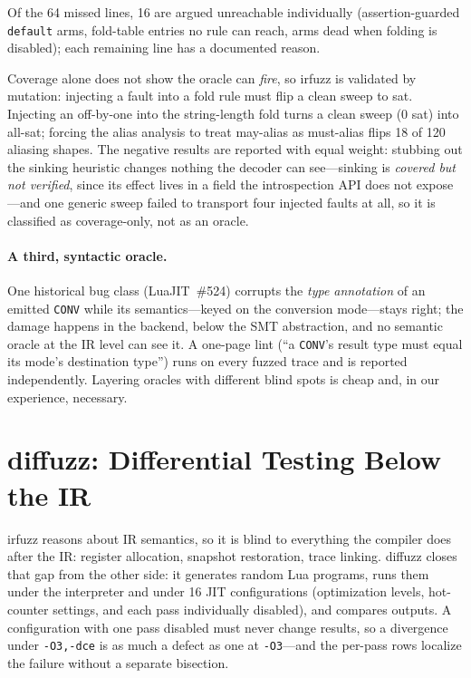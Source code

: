 \documentclass[runningheads]{llncs}
\newif\iffull \fulltrue
\newcommand{\irfuzz}{\textsf{irfuzz}}
\newcommand{\diffuzz}{\textsf{diffuzz}}
\newcommand{\ir}[1]{\texttt{#1}}
\begin{document}
Of the 64 missed lines, 16 are argued unreachable individually
(assertion-guarded \texttt{default} arms, fold-table entries no rule can
reach, arms dead when folding is disabled); each remaining line has a
documented reason.

Coverage alone does not show the oracle can \emph{fire}, so \irfuzz{} is
validated by mutation: injecting a fault into a fold rule must flip a clean
sweep to \textsf{sat}. Injecting an off-by-one into the string-length fold
turns a clean sweep (0 \textsf{sat}) into all-\textsf{sat}; forcing the
alias analysis to treat may-alias as must-alias flips 18 of 120 aliasing
shapes. \iffull The negative results are reported with equal weight:
stubbing out the sinking heuristic changes nothing the decoder can
see---sinking is \emph{covered but not verified}, since its effect lives in
a field the introspection API does not expose---and one generic sweep
failed to transport four injected faults at all, so it is classified as
coverage-only, not as an oracle.\fi

\iffull
\paragraph{A third, syntactic oracle.} One historical bug class
(LuaJIT~\#524) corrupts the \emph{type annotation} of an emitted \ir{CONV}
while its semantics---keyed on the conversion mode---stays right; the
damage happens in the backend, below the SMT abstraction, and no semantic
oracle at the IR level can see it. A one-page lint (``a \ir{CONV}'s result
type must equal its mode's destination type'') runs on every fuzzed trace
and is reported independently. Layering oracles with different blind spots
is cheap and, in our experience, necessary.
\fi %

\section{\diffuzz: Differential Testing Below the IR}\label{sec:diffuzz}

\irfuzz{} reasons about IR semantics, so it is blind to everything the
compiler does after the IR: register allocation, snapshot restoration,
trace linking. \diffuzz{} closes that gap from the other side: it generates
random Lua programs, runs them under the interpreter and under 16 JIT
configurations (optimization levels, hot-counter settings, and each pass
individually disabled), and compares outputs.\iffull{} A configuration
with one pass
disabled must never change results, so a divergence under
\texttt{-O3,-dce} is as much a defect as one at \texttt{-O3}---and the
per-pass rows localize the failure without a separate bisection.\fi
\end{document}
